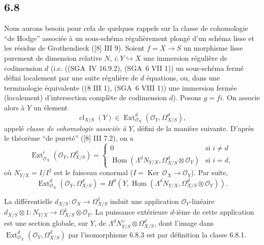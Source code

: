 \documentclass[11pt]{article}
\providecommand{\cO}{\mathcal{O}}
\DeclareMathOperator{\Hom}{Hom}
\DeclareMathOperator{\Ext}{Ext}
\providecommand{\Ker}{\operatorname{Ker}}
\providecommand{\cl}{\operatorname{cl}}
\providecommand{\OO}{\mathcal{O}}
\providecommand{\Hom}{\operatorname{Hom}}
\providecommand{\Ker}{\operatorname{Ker}}
\providecommand{\Ker}{\operatorname{Ker}}
\providecommand{\cl}{\operatorname{cl}}
\providecommand{\Hom}{\operatorname{Hom}}
\providecommand{\cl}{\operatorname{cl}}
\begin{document}
\subsection*{6.8}
Nous aurons besoin pour cela de quelques rappels sur la classe de cohomologie ``de Hodge'' associée à un sous-schéma régulièrement plongé d'un schéma lisse et les résidus de Grothendieck ([8] III 9). Soient $f=X\to S$ un morphisme lisse purement de dimension relative $N$, $i:Y\hookrightarrow X$ une immersion régulière de codimension $d$ (i.e. ((SGA~IV 16.9.2), (SGA~6 VII 1)) un sous-schéma fermé défini localement par une suite régulière de $d$ équations, ou, dans une terminologie équivalente ((8 III 1), (SGA~6 VIII 1)) une immersion fermée (localement) d'intersection complète de codimension $d$). Posons $g=fi$. On associe alors à $Y$ un élement
\begin{equation}
\tag{6.8.1}
\cl_{X/S}(Y)\in\Ext^d_{\cO_X}(\cO_Y,\Omega^d_{X/S}),
\end{equation}
appelé \emph{classe de cohomologie associée à} $Y$, défini de la manière suivante. D'après le théorème ``de pureté'' ([8] III 7.2), on a
\begin{equation}
\tag{6.8.2}
\underline{\Ext}^i_{\cO_X}(\cO_Y,\Omega^d_{X/S})=
\begin{cases}
0& \text{si } i\ne d\\
\underline{\Hom}(\Lambda^d N_{Y/X},\Omega^d_{X/S}\otimes\cO_Y)& \text{si } i=d,
\end{cases}
\end{equation}
où $N_{Y/X}=I/I^2$ est le faisceau conormal ($I=\Ker\,\cO_X\to\cO_Y$). Par suite,
\begin{equation}
\tag{6.8.3}
\Ext^d_{\cO_X}(\cO_Y,\Omega^d_{X/S})=H^0(Y,\underline{\Hom}(\Lambda^dN_{Y/X},\Omega^d_{X/S}\otimes\cO_Y)).
\end{equation}

La différentielle $d_{X/S}:\OO_X\to\Omega^1_{X/S}$ induit une application $\OO_Y$-linéaire $d_{X/S}\otimes 1:N_{Y/X}\longrightarrow \Omega^1_{X/S}\otimes\OO_Y$. La puissance extérieure $d$-ième de cette application est une section globale, sur $Y$, de $\Lambda^d N_{Y/S}^{\vee}\otimes\Omega^d_{X/S}$, dont l'image dans $\Ext^d_{\OO_X}(\OO_Y,\Omega^d_{X/S})$ par l'isomorphisme 6.8.3 est par définition la classe 6.8.1.
\end{document}
